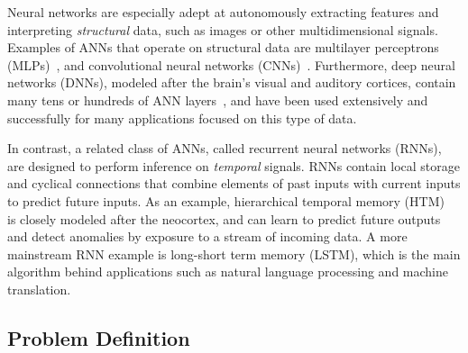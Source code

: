 Neural networks are especially adept at autonomously extracting features and interpreting \textit{structural} data, such as images or other multidimensional signals.
Examples of ANNs that operate on structural data are multilayer perceptrons (MLPs)~\cite{rosenblatt1961principles}, and convolutional neural networks (CNNs)~\cite{karpathy2015cs231n}.
Furthermore, deep neural networks (DNNs), modeled after the brain's visual and auditory cortices, contain many tens or hundreds of ANN layers~\cite{lee2009convolutional, simonyan2014very, sermanet2013overfeat, szegedy2015going, krizhevsky2012imagenet}, and have been used extensively and successfully for many applications focused on this type of data.

In contrast, a related class of ANNs, called recurrent neural networks (RNNs), are designed to perform inference on \textit{temporal} signals.
RNNs contain local storage and cyclical connections that combine elements of past inputs with current inputs to predict future inputs.
As an example, hierarchical temporal memory (HTM)~\cite{ahmad2015properties, mnatzaganian2017mathematical} is closely modeled after the neocortex, and can learn to predict future outputs and detect anomalies by exposure to a stream of incoming data.
A more mainstream RNN example is long-short term memory (LSTM), which is the main algorithm behind applications such as natural language processing and machine translation.

\subsection{Problem Definition}

